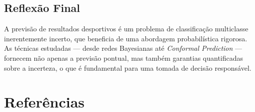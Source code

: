 \documentclass[12pt, a4paper]{article}
\begin{document}
\subsection{Reflexão Final}

A previsão de resultados desportivos é um problema de classificação multiclasse inerentemente incerto, que beneficia de uma abordagem probabilística rigorosa. As técnicas estudadas — desde redes Bayesianas até \textit{Conformal Prediction} — fornecem não apenas a previsão pontual, mas também garantias quantificadas sobre a incerteza, o que é fundamental para uma tomada de decisão responsável.

\section*{Referências}
\end{document}
